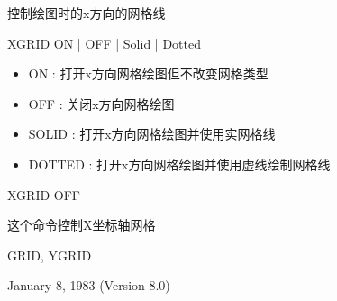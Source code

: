 \label{cmd:xgrid}

控制绘图时的x方向的网格线

XGRID ON | OFF | Solid | Dotted

\begin{itemize}
\item ON : 打开x方向网格绘图但不改变网格类型 
\item OFF : 关闭x方向网格绘图 
\item SOLID : 打开x方向网格绘图并使用实网格线 
\item DOTTED : 打开x方向网格绘图并使用虚线绘制网格线 
\end{itemize}

XGRID OFF

这个命令控制X坐标轴网格

GRID, YGRID

January 8, 1983 (Version 8.0)

